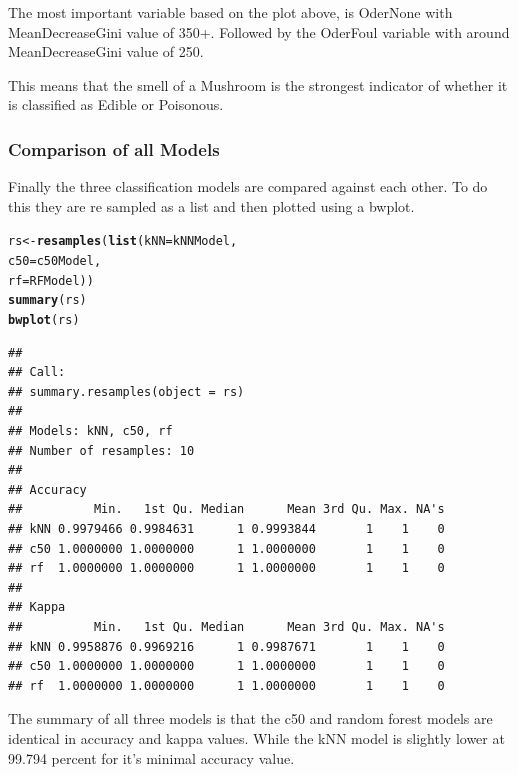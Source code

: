 \documentclass[10pt  ,usenames, dvipsnames]{article}\usepackage[]{graphicx}\usepackage[]{color}
\makeatletter
\newcommand{\hlstd}[1]{\textcolor[rgb]{0.345,0.345,0.345}{#1}}%
\newcommand{\hlkwb}[1]{\textcolor[rgb]{0.69,0.353,0.396}{#1}}%
\newcommand{\hlkwc}[1]{\textcolor[rgb]{0.333,0.667,0.333}{#1}}%
\newcommand{\hlkwd}[1]{\textcolor[rgb]{0.737,0.353,0.396}{\textbf{#1}}}%
\newenvironment{kframe}{%
 \def\at@end@of@kframe{}%
 \ifinner\ifhmode%
  \def\at@end@of@kframe{\end{minipage}}%
  \begin{minipage}{\columnwidth}%
 \fi\fi%
 \def\FrameCommand##1{\hskip\@totalleftmargin \hskip-\fboxsep
 \colorbox{shadecolor}{##1}\hskip-\fboxsep
     \hskip-\linewidth \hskip-\@totalleftmargin \hskip\columnwidth}%
 \MakeFramed {\advance\hsize-\width
   \@totalleftmargin\z@ \linewidth\hsize
   \@setminipage}}%
 {\par\unskip\endMakeFramed%
 \at@end@of@kframe}
\newenvironment{knitrout}{}{} %
\makeatother
\begin{document}
The most important variable based on the plot above, is OderNone with MeanDecreaseGini value of 350+. Followed by the OderFoul variable  with around MeanDecreaseGini value of 250.

This means that the smell of a Mushroom is the strongest indicator of whether it is classified  as Edible or Poisonous.

\clearpage


\subsubsection{Comparison of all Models}

Finally the three classification models are compared against each other.
To do this they are re sampled as a list and then plotted using a bwplot.

\begin{knitrout}
\color{fgcolor}\begin{kframe}
\begin{alltt}
\hlstd{rs} \hlkwb{<-} \hlkwd{resamples}\hlstd{(}\hlkwd{list}\hlstd{(}\hlkwc{kNN} \hlstd{= kNNModel,}
                     \hlkwc{c50} \hlstd{= c50Model,}
                     \hlkwc{rf} \hlstd{= RFModel))}
\hlkwd{summary}\hlstd{(rs)}
\hlkwd{bwplot}\hlstd{(rs)}
\end{alltt}
\end{kframe}
\end{knitrout}
\begin{knitrout}
\color{fgcolor}\begin{kframe}
\begin{verbatim}
## 
## Call:
## summary.resamples(object = rs)
## 
## Models: kNN, c50, rf 
## Number of resamples: 10 
## 
## Accuracy 
##          Min.   1st Qu. Median      Mean 3rd Qu. Max. NA's
## kNN 0.9979466 0.9984631      1 0.9993844       1    1    0
## c50 1.0000000 1.0000000      1 1.0000000       1    1    0
## rf  1.0000000 1.0000000      1 1.0000000       1    1    0
## 
## Kappa 
##          Min.   1st Qu. Median      Mean 3rd Qu. Max. NA's
## kNN 0.9958876 0.9969216      1 0.9987671       1    1    0
## c50 1.0000000 1.0000000      1 1.0000000       1    1    0
## rf  1.0000000 1.0000000      1 1.0000000       1    1    0
\end{verbatim}
\end{kframe}
\end{knitrout}

The summary of all three models is that the c50 and random forest models are identical in accuracy and kappa values. While the kNN model is slightly lower at 99.794 percent for it's minimal accuracy value.
\end{document}

